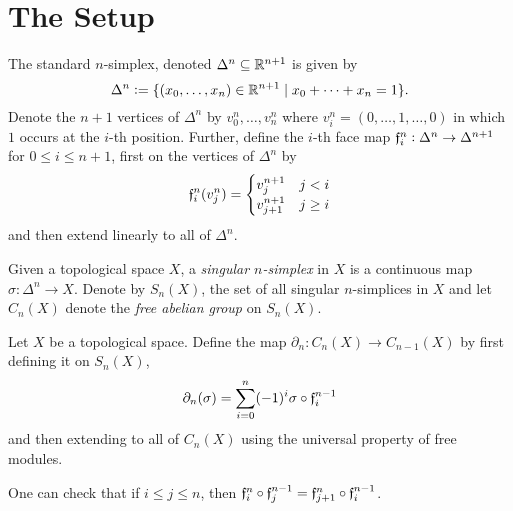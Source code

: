 \section{The Setup}

\begin{definition}
    The standard $n$-simplex, denoted $\Delta^n\subseteq\mathbb{R}^{n + 1}$ is given by 
    \begin{equation*}
        \Delta^n := \{(x_0,\dots,x_n)\in\mathbb{R}^{n + 1}\mid x_0 + \dots + x_n = 1\}.
    \end{equation*}
    Denote the $n + 1$ vertices of $\Delta^n$ by $v^n_0,\dots,v^n_n$ where $v^n_i = (0,\dots, 1,\dots, 0)$ in which $1$ occurs at the $i$-th position. Further, define the $i$-th face map $\mathfrak f_i^n: \Delta^n\to\Delta^{n + 1}$ for $0\le i\le n + 1$, first on the vertices of $\Delta^n$ by 
    \begin{equation*}
        \mathfrak f_i^n(v_j^n) =
        \begin{cases}
            v_j^{n + 1} & j < i\\
            v_{j + 1}^{n + 1} & j\ge i
        \end{cases}
    \end{equation*}
    and then extend linearly to all of $\Delta^n$.

    Given a topological space $X$, a \emph{singular $n$-simplex} in $X$ is a continuous map $\sigma: \Delta^n\to X$. Denote by $S_n(X)$, the set of all singular $n$-simplices in $X$ and let $C_n(X)$ denote the \emph{free abelian group} on $S_n(X)$.
\end{definition}

\begin{definition}
    Let $X$ be a topological space. Define the map $\partial_n: C_n(X)\to C_{n - 1}(X)$ by first defining it on $S_n(X)$, 
    \begin{equation*}
        \partial_n(\sigma) = \sum_{i = 0}^n(-1)^i\sigma\circ\mathfrak f_i^{n - 1}
    \end{equation*}
    and then extending to all of $C_n(X)$ using the universal property of free modules.
\end{definition}

\begin{remark}
    One can check that if $i\le j\le n$, then $\mathfrak f_i^n\circ\mathfrak f_j^{n - 1} = \mathfrak f_{j + 1}^n\circ\mathfrak f_i^{n - 1}$.
\end{remark}

